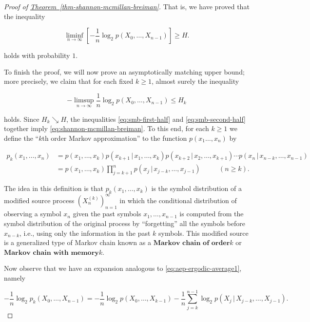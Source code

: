 \documentclass[11pt]{report}
\theoremstyle{plain}
\theoremstyle{definition}
\begin{document}
\begin{proof}[Proof of \texorpdfstring{\hyperref[thm-shannon-mcmillan-breiman]{Theorem~\ref*{thm-shannon-mcmillan-breiman}}}{Theorem}]
\noindent That is, we have proved that the inequality

\begin{equation*} \tag{40}\label{eq:smb-first-half}
\liminf_{n\to\infty} \left[-\frac{1}{n} \log_2 p(X_0,\ldots,X_{n-1})\right] \ge H.
\end{equation*}

\noindent holds with probability $1$.

To finish the proof, we will now prove an
asymptotically matching upper bound; more precisely,
we claim that for each fixed $k\ge1$, almost surely
the inequality

\begin{equation*} \tag{41}\label{eq:smb-second-half}
-\limsup_{n\to\infty} \frac{1}{n} \log_2 p(X_0,\ldots,X_{n-1}) \le H_k
\end{equation*}

\noindent holds. Since $H_k \searrow H$, the inequalities
\eqref{eq:smb-first-half} and \eqref{eq:smb-second-half}
together imply \eqref{eq:shannon-mcmillan-breiman}. To
this end, for each $k\ge 1$ we define the ``$k$th
order Markov approximation'' to the function
$p(x_1\ldots,x_n)$ by

\begin{align*}
p_k(x_1,\ldots,x_n) &= p(x_1,\ldots,x_k) p(x_{k+1}\,|\,x_1,\ldots,x_k)
p(x_{k+2}\,|\,x_2,\ldots,x_{k+1}) \cdots p(x_n\,|\, x_{n-k},\ldots, x_{n-1}) \\ &= p(x_1,\ldots,x_k)
\prod_{j=k+1}^n p(x_j\,|\, x_{j-k},\ldots,x_{j-1}) \qquad \ \ \ (n\ge k).
\end{align*}

\noindent The idea in this definition is that
$p_k(x_1,\ldots,x_k)$ is the symbol distribution of a
modified source process $(X_n^{(k)})_{n=1}^\infty$ in
which the conditional distribution of observing a
symbol $x_n$ given the past symbols
$x_1,\ldots,x_{n-1}$ is computed from the symbol
distribution of the original process by ``forgetting''
all the symbols before $x_{n-k}$, i.e., using only
the information in the past $k$ symbols. This
modified source is a generalized type of Markov chain
known as a $\textbf{Markov chain of order$k$}$ or
$\textbf{Markov chain with memory$k$}$.

Now observe that we have an expansion analogous to
\eqref{eq:aep-ergodic-average1}, namely

\[
-\frac{1}{n} \log_2 p_k(X_0,\ldots,X_{n-1}) = -\frac{1}{n} \log_2 p(X_0,\ldots,X_{k-1}) - \frac{1}{n} \sum_{j=k}^{n-1} \log_2 p(X_j\,|\,X_{j-k},\ldots,X_{j-1}).
\]


\end{proof}
\end{document}
